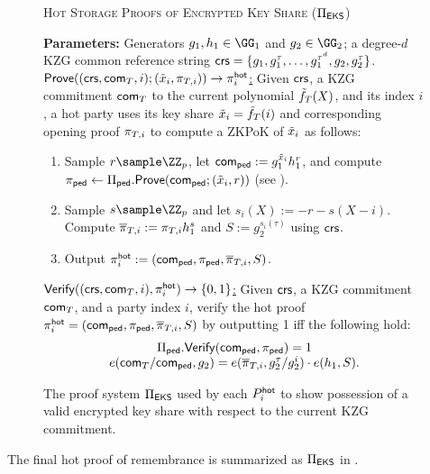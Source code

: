 \begin{figure*}[tb]
    \centering
    \begin{mdframed}
    \begin{center}
        \textsc{Hot Storage Proofs of Encrypted Key Share ($\Pi_{\sf EKS}$)}
    \end{center}
    \medskip
    \textbf{Parameters:} Generators $g_1,h_1 \in \GG_1$ and $g_2 \in \GG_2$; a degree-$d$ KZG common reference string $\mathsf{crs} = \{g_1, g_1^\tau, \dots, g_1^{\tau^d}, g_2, g_2^\tau\}$.
    \hfill\medskip\\
    \underline{$\mathsf{Prove}((\mathsf{crs}, \mathsf{com}_{T}, i); (\tilde{x}_i, \pi_{T,i})) \to \pi_i^{\mathsf{hot}}$:} Given $\mathsf{crs}$, a KZG commitment $\mathsf{com}_{T}$ to the current polynomial $\tilde{f}_{T}(X)$, and its index $i$, a hot party uses its key share $\tilde{x}_i = \tilde{f}_{T}(i)$ and corresponding opening proof $\pi_{T,i}$
    to compute a ZKPoK of $\tilde{x}_i$ as follows:
    \begin{enumerate}
        \item Sample $r \sample \ZZ_p$, let $\mathsf{com}_{\sf ped} := g_1^{\tilde{x}_i} h_1^r$, and compute $\pi_{\sf ped} \gets \Pi_{\sf ped}.{\sf Prove}(\mathsf{com}_{\sf ped}; (\tilde{x}_i,r))$ (see ).
        \item Sample $s \sample \ZZ_p$ and let $s_i(X) := -r - s(X -i)$. Compute $\overline{\pi}_{T,i} := \pi_{T,i} h_1^s$ and $S := g_2^{s_i(\tau)}$ using $\mathsf{crs}$.
        \item Output $\pi_i^{\mathsf{hot}} := (\mathsf{com}_{\sf ped}, \pi_{\sf ped}, \overline{\pi}_{T,i}, S)$.
    \end{enumerate}
    \underline{${\mathsf{Verify}}((\mathsf{crs}, \mathsf{com}_{T}, i), \pi_i^{\mathsf{hot}}) \to \{0,1\}$:} Given $\mathsf{crs}$, a KZG commitment $\mathsf{com}_{T}$, and a party index $i$, verify the hot proof $\pi_i^{\mathsf{hot}} = (\mathsf{com}_{\sf ped}, \pi_{\sf ped}, \overline{\pi}_{T,i}, S)$ by outputting 1 iff the following hold: 
    \[\begin{array}{c}
        \Pi_{\sf ped}.{\mathsf{Verify}}(\mathsf{com}_{\sf ped}, \pi_{\sf ped}) = 1\\
        e(\mathsf{com}_{T} / \mathsf{com}_{\sf ped}, g_2) = e(\overline{\pi}_{T,i}, g_2^\tau / g_2^i) \cdot e(h_1, S).
    \end{array}\]
    \end{mdframed}
    \caption{The proof system $\Pi_{\sf EKS}$ used by each $P_i^{\mathsf{hot}}$ to show possession of a valid encrypted key share with respect to the current KZG commitment.}
    \label{fig:pi_eks}
\end{figure*}

The final hot proof of remembrance is summarized as $\Pi_{\sf EKS}$ in . 